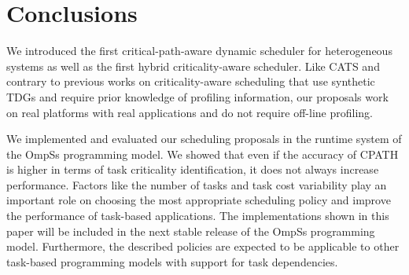 
\section{Conclusions}
\label{sec.scheduling.conclusions}
We introduced the first critical-path-aware dynamic scheduler for heterogeneous systems as well as the first hybrid criticality-aware scheduler. Like CATS and contrary to previous works on criticality-aware scheduling that use synthetic TDGs and require prior knowledge of profiling information, our proposals work on real platforms with real applications and do not require off-line profiling.

We implemented and evaluated our scheduling proposals in the runtime system of the OmpSs programming model.
We showed that even if the accuracy of CPATH is higher in terms of task criticality identification, it does not always increase performance. 
Factors like the number of tasks and task cost variability play an important role on choosing the most appropriate scheduling policy and improve the performance of task-based applications.
The implementations shown in this paper will be included in the next stable release of the OmpSs programming model. 
Furthermore, the described policies are expected to be applicable to other task-based programming models with support for task dependencies. 

    

